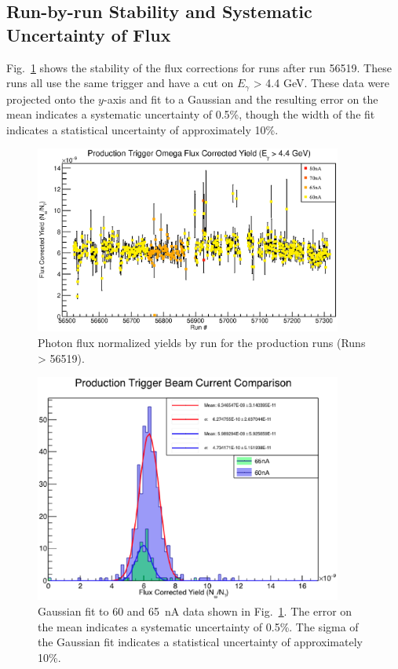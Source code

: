 \subsection{\label{sec:flux.runbyrun}Run-by-run Stability and Systematic Uncertainty of Flux}

Fig.~\ref{gfluxbyrun} shows the stability of the flux corrections for runs after run 56519. These runs all use the same trigger and have a cut on $E_{\gamma}$ > 4.4 GeV. These data were projected onto the $y$-axis and fit to a Gaussian and the resulting error on the mean indicates a systematic uncertainty of 0.5\%, though the width of the fit indicates a statistical uncertainty of approximately 10\%.

\begin{figure}[htpb]
\begin{center}
 \includegraphics[width=0.9\textwidth]{figures/gflux/gflux_runstability_omega.eps}
  \caption{Photon flux normalized yields by run for the production runs (Runs > 56519).}
  \label{gfluxbyrun}
  \end{center}
\end{figure}

\begin{figure}[htpb]
\begin{center}
 \includegraphics[width=0.9\textwidth]{figures/gflux/60vs65comparison_withparameters.eps}
  \caption{Gaussian fit to 60 and 65~nA data shown in Fig.~\ref{gfluxbyrun}. The error on the mean indicates a systematic uncertainty of 0.5\%. The sigma of the Gaussian fit indicates a statistical uncertainty of approximately 10\%.}
  \label{gfluxbyrun_pull}
  \end{center}
\end{figure}


